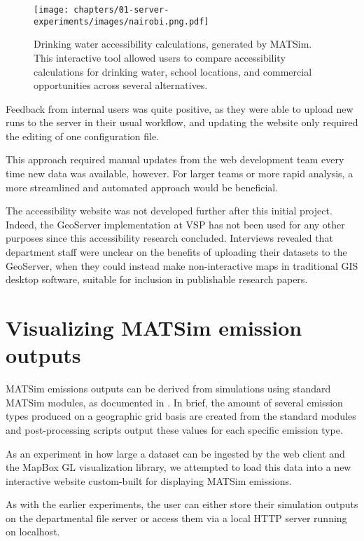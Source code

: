 \begin{figure}[!ht]
  \texttt{[image: chapters/01-server-experiments/images/nairobi.png.pdf]}
  \caption[Drinking water accessibility calculations, generated by MATSim]{Drinking water accessibility calculations, generated by MATSim. This interactive tool allowed users to compare accessibility calculations for drinking water, school locations, and commercial opportunities across several alternatives.}
  \label{fig:nairobi}
\end{figure}

Feedback from internal users was quite positive, as they were able to upload new runs to the server in their usual workflow, and updating the website only required the editing of one configuration file.

This approach required manual updates from the web development team every time new data was available, however. For larger teams or more rapid analysis, a more streamlined and automated approach would be beneficial.

The accessibility website was not developed further after this initial project. Indeed, the GeoServer implementation at VSP has not been used for any other purposes since this accessibility research concluded. Interviews revealed that department staff were unclear on the benefits of uploading their datasets to the GeoServer, when they could instead make non-interactive maps in traditional GIS desktop software, suitable for inclusion in publishable research papers.

\hypertarget{server-experiments-emissions}{%
\section{Visualizing MATSim emission outputs}
\label{server-experiments-emissions}}

MATSim emissions outputs can be derived from simulations using standard MATSim modules, as documented in \cite{Kickhoefer2015EmissionModeling}. In brief, the amount of several emission types produced on a geographic grid basis are created from the standard modules and post-processing scripts output these values for each specific emission type.

As an experiment in how large a dataset can be ingested by the web client and the MapBox GL visualization library, we attempted to load this data into a new interactive website custom-built for displaying MATSim emissions.

As with the earlier experiments, the user can either store their simulation outputs on the departmental file server or access them via a local HTTP server running on localhost.

